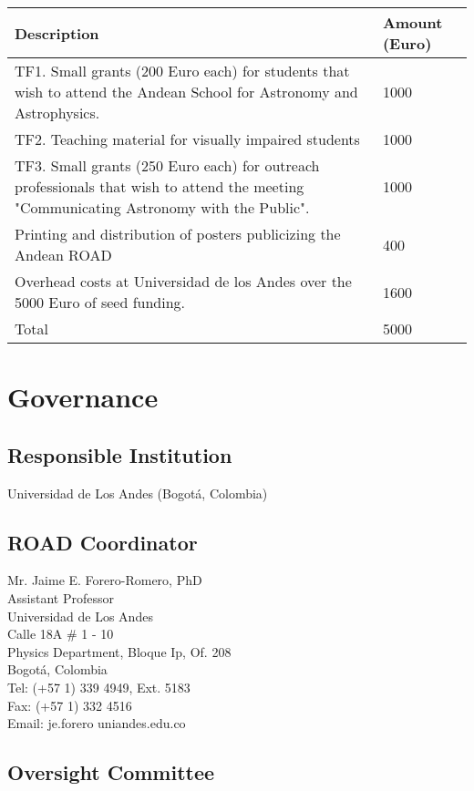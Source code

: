 \documentclass[12pt]{article}
\begin{document}
\begin{center}
\begin{tabular}{|p{11cm} |p{1.5cm}|}\hline\hline
Description &Amount (Euro) \\\hline
TF1. Small grants (200 Euro each) for students that wish to attend the
Andean School for Astronomy and Astrophysics. & 1000\\\hline 
TF2.  Teaching material for visually impaired students & 1000\\\hline
TF3. Small grants (250 Euro each) for outreach professionals that
wish to attend the meeting "Communicating Astronomy with the Public".&
1000\\\hline  
Printing and distribution of posters publicizing the Andean ROAD
&400 \\\hline 
Overhead costs at Universidad de los Andes over the 5000 Euro of seed
funding. & 1600\\\hline 
Total &5000\\\hline\hline
\end{tabular}
\end{center}


\section{Governance}

\subsection*{Responsible Institution}
\noindent
Universidad de Los Andes (Bogotá, Colombia)

\subsection*{ROAD Coordinator}
\noindent
Mr. Jaime E. Forero-Romero, PhD\\
Assistant Professor\\
Universidad de Los Andes\\
Calle 18A \# 1 - 10\\
Physics Department, Bloque Ip, Of. 208\\
Bogot\'a, Colombia\\
Tel:  (+57 1) 339 4949, Ext. 5183\\
Fax: (+57 1) 332 4516 \\
Email: je.forero uniandes.edu.co\\

\subsection*{Oversight Committee}
\end{document}
